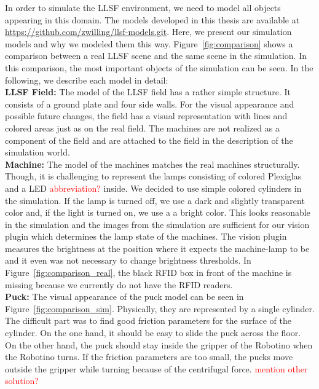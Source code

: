 In order to simulate the LLSF environment, we need to model all objects appearing in this domain. The models developed in this thesis are available at \url{https://github.com/zwilling/llsf-models.git}. Here, we present our simulation models and why we modeled them this way. Figure~\ref{fig:comparison} shows a comparison between a real LLSF scene and the same scene in the simulation. In this comparison, the most important objects of the simulation can be seen. In the following, we describe each model in detail:\\
\textbf{LLSF Field:} The model of the LLSF field has a rather simple structure. It consists of a ground plate and four side walls. For the visual appearance and possible future changes, the field has a visual representation with lines and colored areas just as on the real field. The machines are not realized as a component of the field and are attached to the field in the description of the simulation world.\\
\textbf{Machine:} The model of the machines matches the real machines structurally. Though, it is challenging to represent the lamps consisting of colored Plexiglas and a LED \textcolor{red}{abbreviation?} inside. We decided to use simple colored cylinders in the simulation. If the lamp is turned off, we use a dark and slightly transparent color and, if the light is turned on, we use a a bright color. This looks reasonable in the simulation and the images from the simulation are sufficient for our vision plugin which determines the lamp state of the machines. The vision plugin measures the brightness at the position where it expects the machine-lamp to be and it even was not necessary to change brightness thresholds. In Figure~\ref{fig:comparison_real}, the black RFID box in front of the machine is missing because we currently do not have the RFID readers.\\
\textbf{Puck:} The visual appearance of the puck model can be seen in Figure~\ref{fig:comparison_sim}. Physically, they are represented by a single cylinder. The difficult part was to find good friction parameters for the surface of the cylinder. On the one hand, it should be easy to slide the puck across the floor. On the other hand, the puck should stay inside the gripper of the Robotino when the Robotino turns. If the friction parameters are too small, the pucks move outside the gripper while turning because of the centrifugal force. \textcolor{red}{mention other solution?}\\

